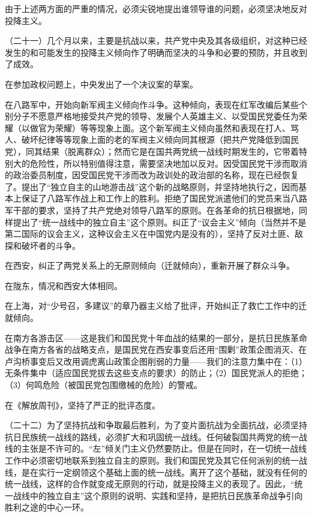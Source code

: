 由于上述两方面的严重的情况，必须尖锐地提出谁领导谁的问题，必须坚决地反对投降主义。

（二十一）几个月以来，主要是抗战以来，共产党中央及其各级组织，对这种已经发生的和可能发生的投降主义倾向作了明确而坚决的斗争和必要的预防，并且收到了成效。

在参加政权问题上，中央发出了一个决议案的草案。

在八路军中，开始向新军阀主义倾向作斗争。这种倾向，表现在红军改编后某些个别分子不愿意严格地接受共产党的领导、发展个人英雄主义、以受国民党委任为荣耀（以做官为荣耀）等等现象上面。这个新军阀主义倾向虽然和表现在打人、骂人、破坏纪律等等现象上面的老的军阀主义倾向同其根源（把共产党降低到国民党），同其结果（脱离群众）；然而它是在国共两党统一战线时期发生的，它带着特别大的危险性，所以特别值得注意，需要坚决地加以反对。因受国民党干涉而取消的政治委员制度，因受国民党干涉而改为政训处的政治部的名称，现在已经恢复了。提出了“独立自主的山地游击战”这个新的战略原则，并坚持地执行之，因而基本上保证了八路军作战上和工作上的胜利。拒绝了国民党派遣他们的党员来当八路军干部的要求，坚持了共产党绝对领导八路军的原则。在各革命的抗日根据地，同样提出了“统一战线中的独立自主”这个原则。纠正了“议会主义”倾向（当然并不是第二国际的议会主义，这种议会主义在中国党内是没有的），坚持了反对土匪、敌探和破坏者的斗争。

在西安，纠正了两党关系上的无原则倾向（迁就倾向），重新开展了群众斗争。

在陇东，情况和西安大体相同。

在上海，对“少号召，多建议”的章乃器主义给了批评，开始纠正了救亡工作中的迁就倾向。

在南方各游击区——这是我们和国民党十年血战的结果的一部分，是抗日民族革命战争在南方各省的战略支点，是国民党在西安事变后还用“围剿”政策企图消灭、在卢沟桥事变后又改用调虎离山政策企图削弱的力量——我们的注意力集中在：（1）无条件集中（适应国民党拔去这些支点的要求）的防止；（2）国民党派人的拒绝；（3）何鸣危险（被国民党包围缴械的危险）的警戒。

在《解放周刊》，坚持了严正的批评态度。

（二十二）为了坚持抗战和争取最后胜利，为了变片面抗战为全面抗战，必须坚持抗日民族统一战线的路线，必须扩大和巩固统一战线。任何破裂国共两党的统一战线的主张是不许可的。“左”倾关门主义仍然要防止。但是在同时，在一切统一战线工作中必须密切地联系到独立自主的原则。我们和国民党及其它任何派别的统一战线，是在实行一定纲领这个基础上面的统一战线。离开了这个基础，就没有任何的统一战线，这样的合作就变成无原则的行动，就是投降主义的表现了。因此，“统一战线中的独立自主”这个原则的说明、实践和坚持，是把抗日民族革命战争引向胜利之途的中心一环。

